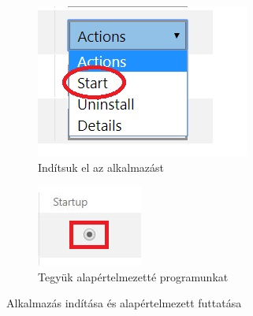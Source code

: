 \documentclass[a4paper,12pt]{report}
\begin{document}
    \begin{figure}[h!]
        \centering
        \begin{subfigure}[b]{0.4\linewidth}
            \includegraphics[width=\linewidth]{images/startapp.jpg}
            \caption{Indítsuk el az alkalmazást}
        \end{subfigure}
        \begin{subfigure}[b]{0.4\linewidth}
            \includegraphics[width=\linewidth]{images/startupapp.jpg}
            \caption{Tegyük alapértelmezetté programunkat}
        \end{subfigure}
        \caption{Alkalmazás indítása és alapértelmezett futtatása}
        \label{fig:StartupApp}
    \end{figure}
\end{document}
